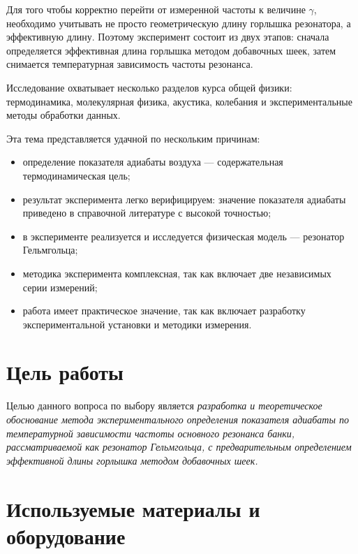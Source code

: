 \documentclass[12pt]{extreport}
\begin{document}
	Для того чтобы корректно перейти от измеренной частоты к величине \(\gamma\), необходимо учитывать не просто геометрическую длину горлышка резонатора, а эффективную длину. Поэтому эксперимент состоит из двух этапов: сначала определяется эффективная длина горлышка методом добавочных шеек, затем снимается температурная зависимость частоты резонанса.
	
	Исследование охватывает несколько разделов курса общей физики: термодинамика, молекулярная физика, акустика, колебания и экспериментальные методы обработки данных.
	
	Эта тема представляется удачной по нескольким причинам:
	\begin{itemize}
		
		\item определение показателя адиабаты воздуха --- содержательная термодинамическая цель;
		\item результат эксперимента легко верифицируем: значение показателя адиабаты приведено в справочной литературе с высокой точностью;
		\item в эксперименте реализуется и исследуется физическая модель --- резонатор Гельмгольца;
		\item методика эксперимента комплексная, так как включает две независимых серии измерений;
		\item работа имеет практическое значение, так как включает разработку экспериментальной установки и методики измерения.
		
	\end{itemize}
	
	\section{Цель работы}
	
	\hspace{4mm} Целью данного вопроса по выбору является \textit{разработка и теоретическое обоснование метода экспериментального определения показателя адиабаты по температурной зависимости частоты основного резонанса банки, рассматриваемой как резонатор Гельмгольца, с предварительным определением эффективной длины горлышка методом добавочных шеек.}
	
	
	\section{Используемые материалы и оборудование}
	
\end{document}
